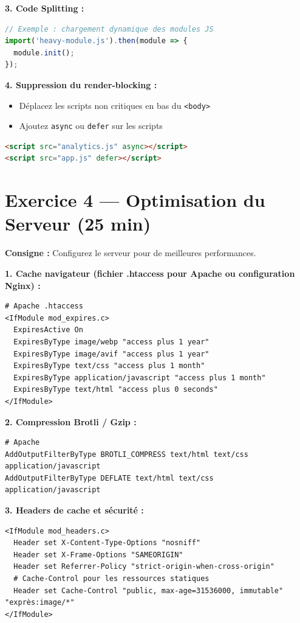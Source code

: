 \documentclass[12pt,a4paper]{report}
\begin{document}
\textbf{3. Code Splitting :}
\begin{lstlisting}[language=JavaScript]
// Exemple : chargement dynamique des modules JS
import('heavy-module.js').then(module => {
  module.init();
});
\end{lstlisting}

\textbf{4. Suppression du render-blocking :}
\begin{itemize}
\item Déplacez les scripts non critiques en bas du \texttt{<body>}
\item Ajoutez \texttt{async} ou \texttt{defer} sur les scripts
\end{itemize}
\begin{lstlisting}[language=HTML]
<script src="analytics.js" async></script>
<script src="app.js" defer></script>
\end{lstlisting}

\section{Exercice 4 --- Optimisation du Serveur (25 min)}

\textbf{Consigne :} Configurez le serveur pour de meilleures performances.

\textbf{1. Cache navigateur (fichier .htaccess pour Apache ou configuration Nginx) :}
\begin{lstlisting}
# Apache .htaccess
<IfModule mod_expires.c>
  ExpiresActive On
  ExpiresByType image/webp "access plus 1 year"
  ExpiresByType image/avif "access plus 1 year"
  ExpiresByType text/css "access plus 1 month"
  ExpiresByType application/javascript "access plus 1 month"
  ExpiresByType text/html "access plus 0 seconds"
</IfModule>
\end{lstlisting}

\textbf{2. Compression Brotli / Gzip :}
\begin{lstlisting}
# Apache
AddOutputFilterByType BROTLI_COMPRESS text/html text/css application/javascript
AddOutputFilterByType DEFLATE text/html text/css application/javascript
\end{lstlisting}

\textbf{3. Headers de cache et sécurité :}
\begin{lstlisting}
<IfModule mod_headers.c>
  Header set X-Content-Type-Options "nosniff"
  Header set X-Frame-Options "SAMEORIGIN"
  Header set Referrer-Policy "strict-origin-when-cross-origin"
  # Cache-Control pour les ressources statiques
  Header set Cache-Control "public, max-age=31536000, immutable" "exprès:image/*"
</IfModule>
\end{lstlisting}
\end{document}
